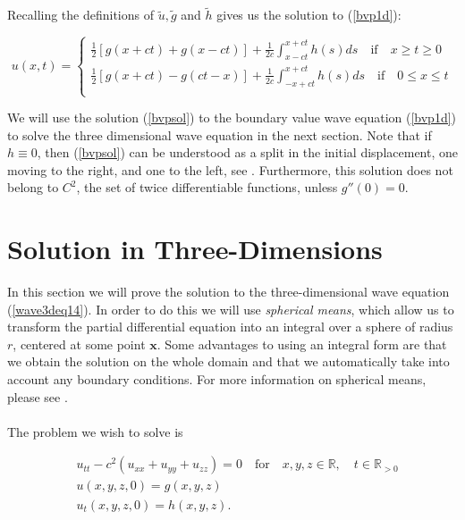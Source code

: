 \documentclass[a4paper, 12pt]{article}
\numberwithin{equation}{section}
\begin{document}
Recalling the definitions of $\tilde{u}, \tilde{g}$ and $\tilde{h}$ gives us the solution to (\ref{bvp1d}):

\begin{equation} \label{bvpsol}
    u(x,t)=
    \begin{cases}
        \frac{1}{2}\left[g(x+ct)+g(x-ct)\right]+\frac{1}{2c}\int^{x+ct}_{x-ct}h(s)ds \quad \textrm{if} \quad x \ge t \ge 0\\
        \frac{1}{2}\left[g(x+ct)-g(ct-x)\right]+\frac{1}{2c}\int^{x+ct}_{-x+ct}h(s)ds \quad \textrm{if} \quad 0 \le x \le t\\
    \end{cases}
\end{equation}

We will use the solution (\ref{bvpsol}) to the boundary value wave equation (\ref{bvp1d}) to solve the three dimensional wave equation in 
the next section. Note that if $h \equiv 0$, then (\ref{bvpsol}) can be understood as a split in the initial displacement, one moving
to the right, and one to the left, see \cite{Ev}. Furthermore, this solution does not belong to $C^2$, the set of twice differentiable functions, 
unless $g''(0)=0$.

\section{Solution in Three-Dimensions}
In this section we will prove the solution to the three-dimensional wave equation (\ref{wave3deq14}). In order to do this we will use \emph{spherical
means}, which allow us to transform the partial differential equation into an integral over a sphere of radius $r$, centered at some point $\boldsymbol{x}$. 
Some advantages to using an integral form are that we obtain the solution on the whole domain and that we automatically take into account any
boundary conditions. For more information on spherical means, please see \cite{Sab}. 
\\
\\

The problem we wish to solve is

\begin{equation} \label{3deq}
\begin{aligned}
    &u_{tt}-c^2(u_{xx}+u_{yy}+u_{zz})=0 \quad \textrm {for} \quad x, y, z \in \mathbb{R}, \quad t \in \mathbb{R}_{>0}\\
    &u(x, y, z,0)=g(x,y,z)\\
    &u_t(x,y,z,0)=h(x,y,z).\\
\end{aligned}
\end{equation}
\end{document}

